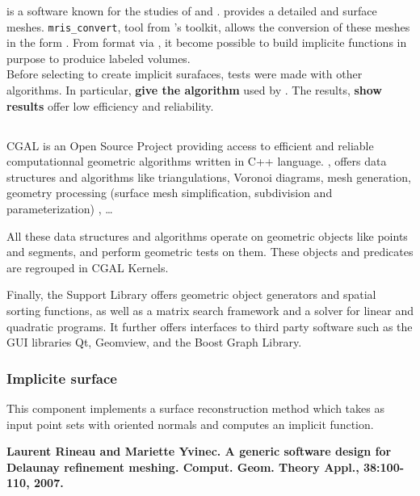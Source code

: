 \FREESURFER{} is a software known for the studies of \WM{} and \GM{}. \FREESURFER{} provides a detailed \WM{} and \GM{} surface meshes. \texttt{mris\_convert}, tool from \FREESURFER{}'s toolkit, allows the conversion of these meshes in the form \STL{}. From \STL{} format via \CGAL{}, it become possible to build implicite functions in purpose to produice labeled  volumes. \\
Before selecting \CGAL{} to create implicit surafaces, tests were made with other algorithms. In particular, {\bf give the algorithm} used by \VTK{}. The results, {\bf show results} offer low efficiency and reliability. \\


\subsection{\CGAL{}}

CGAL is an Open Source Project providing access to efficient and reliable computationnal geometric algorithms written in C++ language. \CGAL{}, offers data structures and algorithms like triangulations, Voronoi diagrams, mesh generation, geometry processing (surface mesh simplification, subdivision and parameterization) , \dots %

All these data structures and algorithms operate on geometric objects like points and segments, and perform geometric tests on them. These objects and predicates are regrouped in CGAL Kernels.

Finally, the Support Library offers geometric object generators and spatial sorting functions, as well as a matrix search framework and a solver for linear and quadratic programs. It further offers interfaces to third party software such as the GUI libraries Qt, Geomview, and the Boost Graph Library. 

\subsubsection{Implicite surface}

This \CGAL{} component implements a surface reconstruction method which takes as input point sets with oriented normals and computes an implicit function. 

{\bf Laurent Rineau and Mariette Yvinec. A generic software design for Delaunay refinement meshing. Comput. Geom. Theory Appl., 38:100-110, 2007. }

